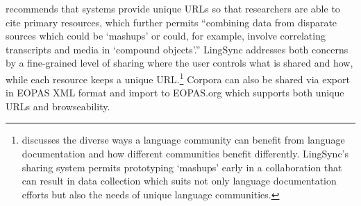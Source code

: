 \documentclass[letterpaper, 12pt, dvips]{mitwpl}
\begin{document}
\cite{Thieberger:2012}  recommends that systems provide unique URLs so that researchers are able to cite primary resources, which further permits ``combining data from disparate sources which could be `mashups' or could, for example, involve correlating transcripts and media in `compound objects'.'' LingSync addresses both concerns by a fine-grained level of sharing where the user controls what is shared and how, while each resource keeps a unique URL.\footnote{ \cite{Musgrave:2012} discusses the diverse ways a language community can benefit from language documentation and how different communities benefit differently. LingSync's sharing system permits prototyping `mashups' early in a collaboration that can result in data collection which suits not only language documentation efforts but also the needs of  unique language communities.} 
Corpora can also be shared via export in EOPAS XML format and import to EOPAS.org which supports both unique URLs and browseability. 





%
%
\end{document}
